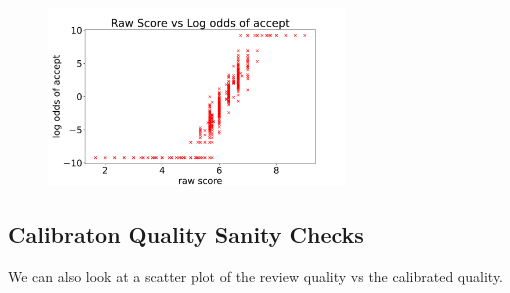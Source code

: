 \begin{figure}[htb]
\includegraphics[width=0.70\textwidth]{diagrams/neurips/raw-score-vs-log-odds.pdf}


\caption{}
\label{raw-score-vs-log-odds}
\end{figure}

\hypertarget{calibraton-quality-sanity-checks}{%
\subsection{Calibraton Quality Sanity
Checks}\label{calibraton-quality-sanity-checks}}

\begin{Shaded}
\begin{Highlighting}[]
\OperatorTok{=} 
\OperatorTok{=}
\end{Highlighting}
\end{Shaded}

We can also look at a scatter plot of the review quality vs the
calibrated quality.

\begin{Shaded}
\begin{Highlighting}[]
\OperatorTok{=}\OperatorTok{=}
\OperatorTok{=}\NormalTok{)}
\NormalTok{ax.set\_xlim([}\NormalTok{, }\NormalTok{])}
\NormalTok{)}
\NormalTok{\_ }\OperatorTok{=}\NormalTok{)}
\OperatorTok{=}\OperatorTok{=}\NormalTok{)}
\end{Highlighting}
\end{Shaded}

